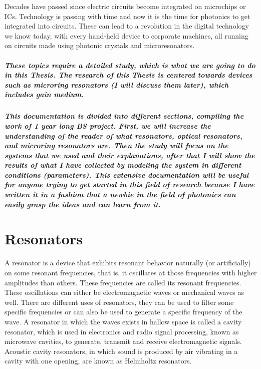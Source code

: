 \normalfont \large Decades have passed since electric circuits become integrated on microchips or ICs. Technology is passing with time and now it is the time for photonics to get integrated into circuits. These can lead to a revolution in the digital technology we know today, with every hand-held device to corporate machines, all running on circuits made using photonic crystals and microresonators. 
\subparagraph{\normalfont \large These topics require a detailed study, which is what we are going to do in this Thesis. The research of this Thesis is centered towards devices such as microring resonators (I will discuss them later), which includes gain medium.}
\subparagraph{\normalfont \large This documentation is divided into different sections, compiling the work of 1 year long BS project. First, we will increase the understanding of the reader of what resonators, optical resonators, and microring resonators are. Then the study will focus on the systems that we used and their explanations, after that I will show the results of what I have collected by modeling the system in different conditions (parameters). This extensive documentation will be useful for anyone trying to get started in this field of research because I have written it in a fashion that a newbie in the field of photonics can easily grasp the ideas and can learn from it. }
\newpage
\section{Resonators}
\normalfont \large A resonator is a device that exhibits resonant behavior naturally (or artificially) on some resonant frequencies, that is, it oscillates at those frequencies with higher amplitudes than others. These frequencies are called its resonant frequencies. These oscillations can either be electromagnetic waves or mechanical waves as well. 
There are different uses of resonators, they can be used to filter some specific frequencies or can also be used to generate a specific frequency of the wave. A resonator in which the waves exists in hallow space is called a cavity resonator, which is used in electronics and radio signal processing,  known as microwave cavities, to generate, transmit and receive electromagnetic signals.  Acoustic cavity resonators, in which sound is produced by air vibrating in a cavity with one opening, are known as Helmholtz resonators.
